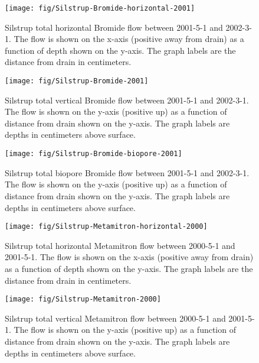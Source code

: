 \documentclass[a4paper]{article}
\begin{document}
\begin{figure}[htbp]
  \centering
  \texttt{[image: fig/Silstrup-Bromide-horizontal-2001]}
  
  \caption{Silstrup total horizontal Bromide flow between 2001-5-1 and
    2002-3-1.  The flow is shown on the x-axis (positive away from
    drain) as a function of depth shown on the y-axis.  The graph
    labels are the distance from drain in centimeters.}
  \label{fig:Silstrup-Bromide-2001-horizontal}
\end{figure}\FloatBarrier

\begin{figure}[htbp]
  \centering
  \texttt{[image: fig/Silstrup-Bromide-2001]}
  
  \caption{Silstrup total vertical Bromide flow between 2001-5-1 and
    2002-3-1.  The flow is shown on the y-axis (positive up) as a
    function of distance from drain shown on the y-axis.  The graph
    labels are depths in centimeters above surface.}
  \label{fig:Silstrup-Bromide-2001-vertical}
\end{figure}\FloatBarrier

\begin{figure}[htbp]
  \centering
  \texttt{[image: fig/Silstrup-Bromide-biopore-2001]}
  
  \caption{Silstrup total biopore Bromide flow between 2001-5-1 and
    2002-3-1.  The flow is shown on the y-axis (positive up) as a
    function of distance from drain shown on the y-axis.  The graph
    labels are depths in centimeters above surface.}
  \label{fig:Silstrup-Bromide-biopore-2001}
\end{figure}\FloatBarrier

\begin{figure}[htbp]
  \centering
  \texttt{[image: fig/Silstrup-Metamitron-horizontal-2000]}
  
  \caption{Silstrup total horizontal Metamitron flow between 2000-5-1 and
    2001-5-1.  The flow is shown on the x-axis (positive away from
    drain) as a function of depth shown on the y-axis.  The graph
    labels are the distance from drain in centimeters.}
  \label{fig:Silstrup-Metamitron-2000-horizontal}
\end{figure}\FloatBarrier

\begin{figure}[htbp]
  \centering
  \texttt{[image: fig/Silstrup-Metamitron-2000]}
  
  \caption{Silstrup total vertical Metamitron flow between 2000-5-1 and
    2001-5-1.  The flow is shown on the y-axis (positive up) as a
    function of distance from drain shown on the y-axis.  The graph
    labels are depths in centimeters above surface.}
  \label{fig:Silstrup-Metamitron-2000-vertical}
\end{figure}\FloatBarrier
\end{document}
